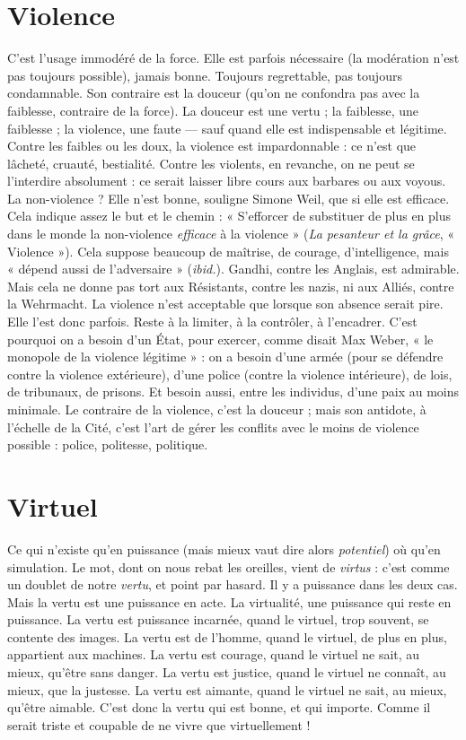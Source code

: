 \section{Violence}
C'est l’usage immodéré de la force. Elle est parfois nécessaire (la
modération n’est pas toujours possible), jamais bonne. Toujours
regrettable, pas toujours condamnable. Son contraire est la douceur
(qu’on ne confondra pas avec la faiblesse, contraire de la force). La douceur est
une vertu ; la faiblesse, une faiblesse ; la violence, une faute — sauf quand elle
est indispensable et légitime. Contre les faibles ou les doux, la violence est
impardonnable : ce n’est que lâcheté, cruauté, bestialité. Contre les violents, en
revanche, on ne peut se l’interdire absolument : ce serait laisser libre cours aux
barbares ou aux voyous. La non-violence ? Elle n’est bonne, souligne Simone
Weil, que si elle est efficace. Cela indique assez le but et le chemin : « S’efforcer
de substituer de plus en plus dans le monde la non-violence {\it efficace} à la
violence » ({\it La pesanteur et la grâce}, « Violence »). Cela suppose beaucoup de
maîtrise, de courage, d'intelligence, mais « dépend aussi de l’adversaire » ({\it ibid.}).
Gandhi, contre les Anglais, est admirable. Mais cela ne donne pas tort aux
Résistants, contre les nazis, ni aux Alliés, contre la Wehrmacht. La violence
n’est acceptable que lorsque son absence serait pire. Elle l’est donc parfois.
Reste à la limiter, à la contrôler, à l’encadrer. C’est pourquoi on a besoin d’un
État, pour exercer, comme disait Max Weber, « le monopole de la violence
légitime » : on a besoin d’une armée (pour se défendre contre la violence extérieure),
d’une police (contre la violence intérieure), de lois, de tribunaux, de
prisons. Et besoin aussi, entre les individus, d’une paix au moins minimale.
Le contraire de la violence, c’est la douceur ; mais son antidote, à l'échelle de la
Cité, c’est l’art de gérer les conflits avec le moins de violence possible : police,
politesse, politique.

\section{Virtuel}
Ce qui n’existe qu’en puissance (mais mieux vaut dire alors {\it potentiel})
où qu’en simulation. Le mot, dont on nous rebat les oreilles,
vient de {\it virtus} : c’est comme un doublet de notre {\it vertu}, et point par hasard. Il
y a puissance dans les deux cas. Mais la vertu est une puissance en acte. La
virtualité, une puissance qui reste en puissance. La vertu est puissance incarnée,
quand le virtuel, trop souvent, se contente des images. La vertu est de l’homme,
quand le virtuel, de plus en plus, appartient aux machines. La vertu est courage,
quand le virtuel ne sait, au mieux, qu'être sans danger. La vertu est justice, quand
le virtuel ne connaît, au mieux, que la justesse. La vertu est aimante, quand le virtuel
ne sait, au mieux, qu'être aimable.
C’est donc la vertu qui est bonne, et qui importe. Comme il serait triste et
coupable de ne vivre que virtuellement !

